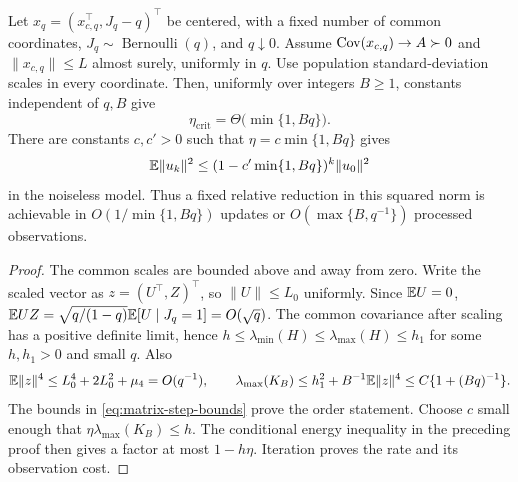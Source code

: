 \begin{proposition}
 \label{prop:block-stability-orders}
 Let $x_q = (x_{c,q}^\top,J_q - q)^\top$ be centered, with a fixed number of
 common coordinates, $J_q \sim \operatorname{Bernoulli}(q)$, and
 $q \downarrow 0$. Assume $\operatorname{Cov}(x_{c,q}) \to A \succ 0$ and $\|x_{c,q}\| \le L$
 almost surely, uniformly in $q$. Use population standard-deviation scales in
 every coordinate. Then, uniformly over integers $B \ge 1$, constants
 independent of $q,B$ give
 \begin{equation}
  \label{eq:batch-rarity-order}
  \eta_{\mathrm{crit}} = \Theta\bigl(\min\{1,Bq\}\bigr).
 \end{equation}
 There are constants $c,c' > 0$ such that $\eta = c\min\{1,Bq\}$ gives
 \[
  \mathbb{E}\|u_k\|^2 \le (1 - c'\min\{1,Bq\})^k\|u_0\|^2
 \]
 in the noiseless model. Thus a fixed relative reduction in this squared norm is
 achievable in $O(1/\min\{1,Bq\})$ updates or $O(\max\{B,q^{-1}\})$ processed
 observations.
\end{proposition}
\begin{proof}
 The common scales are bounded above and away from zero. Write the scaled vector
 as $z = (U^\top,Z)^\top$, so $\|U\| \le L_0$ uniformly. Since $\mathbb{E} U = 0$,
 $\mathbb{E} UZ = \sqrt{q/(1 - q)}\mathbb{E}[U\mid J_q=1] = O(\sqrt q)$. The common covariance
 after scaling has a positive definite limit, hence
 $h \le \lambda_{\min}(H) \le \lambda_{\max}(H) \le h_1$ for some $h,h_1 > 0$
 and small $q$. Also
 \[
  \mathbb{E}\|z\|^4 \le L_0^4 + 2L_0^2 + \mu_4
            = O(q^{-1}),\qquad \lambda_{\max}(K_B)
            \le h_1^2 + B^{-1}\mathbb{E}\|z\|^4
            \le C\{1 + (Bq)^{-1}\}.
 \]
 The bounds in \eqref{eq:matrix-step-bounds} prove the order statement. Choose
 $c$ small enough that $\eta\lambda_{\max}(K_B) \le h$. The conditional energy
 inequality in the preceding proof then gives a factor at most $1 - h\eta$.
 Iteration proves the rate and its observation cost.
\end{proof}

